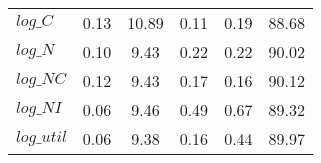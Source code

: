 \begin{center}
\begin{longtable}{lccccc}
$log\_C     $	 & 	        0.13	 & 	       10.89	 & 	        0.11	 & 	        0.19	 & 	       88.68 \\ 
$log\_N     $	 & 	        0.10	 & 	        9.43	 & 	        0.22	 & 	        0.22	 & 	       90.02 \\ 
$log\_NC    $	 & 	        0.12	 & 	        9.43	 & 	        0.17	 & 	        0.16	 & 	       90.12 \\ 
$log\_NI    $	 & 	        0.06	 & 	        9.46	 & 	        0.49	 & 	        0.67	 & 	       89.32 \\ 
$log\_util  $	 & 	        0.06	 & 	        9.38	 & 	        0.16	 & 	        0.44	 & 	       89.97 \\ 
\end{longtable}
 \end{center}

